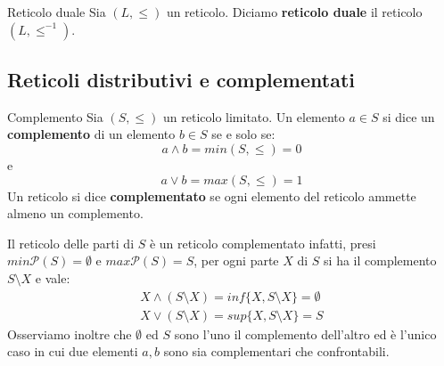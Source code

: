 \begin{defbox}{Reticolo duale}
	Sia $(L,\leq)$ un reticolo. Diciamo \textbf{reticolo duale} il reticolo $(L,\leq^{-1})$.
\end{defbox}

\subsection{Reticoli distributivi e complementati}

\begin{defbox}{Complemento}\label{def:complemento_reticolo}
	Sia $(S,\leq)$ un reticolo limitato. Un elemento $a \in S$ si dice un \textbf{complemento} di un elemento $b \in S$ se e solo se:
	\begin{displaymath}
		a \wedge b = min(S,\leq) = 0
	\end{displaymath}
	e
	\begin{displaymath}
		a \vee b = max(S,\leq) = 1
	\end{displaymath}
	Un reticolo si dice \textbf{complementato} se ogni elemento del reticolo ammette almeno un complemento.
\end{defbox}

\begin{example}
	Il reticolo delle parti di $S$ è un reticolo complementato infatti, presi $min \mathcal{P}(S) = \emptyset$ e $max \mathcal{P}(S)=S$, per ogni parte $X$ di $S$ si ha il complemento $S \setminus X$ e vale:
	\begin{displaymath}
		\begin{array}{l}
			X \wedge (S \setminus X)=inf \{X, S \setminus X\}= \emptyset \\
			X \vee (S \setminus X) = sup\{X, S \setminus X\} = S
		\end{array}
	\end{displaymath}
	Osserviamo inoltre che $\emptyset$ ed $S$ sono l'uno il complemento dell'altro ed è l'unico caso in cui due elementi $a,b$ sono sia complementari che confrontabili.
\end{example}

